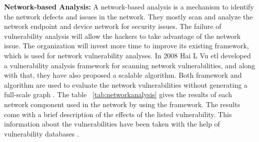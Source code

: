 {\bf Network-based Analysis:} A network-based analysis is a mechanism to identify the network defects and issues in the network. They mostly scan and analyze the network endpoint and device network for security issues. The failure of vulnerability analysis will allow the hackers to take advantage of the network issue. The organization will invest more time to improve its existing framework, which is used for network vulnerability analyses. In 2008 Hai L Vu etl developed a vulnerability analysis framework for scanning network vulnerabilities, and along with that, they have also proposed a scalable algorithm. Both framework and algorithm are used to evaluate the network vulnerabilities without generating a full-scale graph \cite{VuKhChFe2008}. The table ~\ref{tab:networkanalysis} gives the results of each network component used in the network by using the framework. The results come with a brief description of the effects of the listed vulnerability. This information about the vulnerabilities have been taken with the help of vulnerability databases \cite{VuKhChFe2008}.
